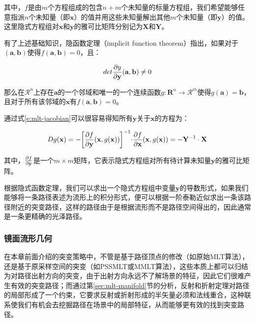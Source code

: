 \noindent 其中，$f$是由$m$个方程组成的包含$n+m$个未知量的标量方程组，我们希望能够任意指派$n$个未知量（即$\mathbf{x}$）的值并用这些未知量解出其他$m$个未知量（即$\mathbf{y}$）的值。这里隐式方程组对$\mathbf{x}$和$\mathbf{y}$的雅可比矩阵分别记为$\mathbf{X}$和$\mathbf{Y}$。

有了上述基础知识，隐函数定理（implicit function theorem）指出，如果对于$(\mathbf{a},\mathbf{b})$使得$f(\mathbf{a},\mathbf{b})=0$，且：

\begin{equation}
	det\frac{{\rm \partial} y}{{\rm \partial} \mathbf{y}}(\mathbf{a},\mathbf{b})\neq 0
\end{equation}

\noindent 那么在$\mathcal{R}^{n}$上存在$\mathbf{a}$的一个邻域和唯一的一个连续函数$g:\mathbf{R}^{n}\to\mathcal{R}^{m}$使得$g(\mathbf{a})=\mathbf{b}$，且对于所有该邻域的$\mathbf{x}$有$f(\mathbf{a},\mathbf{b})=0$。

通过式\ref{e:mlt-jacobian}可以很容易得知所有$\mathbf{y}$关于$\mathbf{x}$的方程为：

\begin{equation}\label{e:mlt-explicit-g}
	Dg(\mathbf{x})=-\biggl[\frac{{\rm \partial} f}{{\rm \partial}\mathbf{y}}(\mathbf{x},g(\mathbf{x})) \biggl]^{-1}\cdot\frac{{\rm \partial} f}{{\rm \partial}\mathbf{x}}(\mathbf{x},g(\mathbf{x}))=-\mathbf{Y}^{-1}\cdot\mathbf{X}
\end{equation}

\noindent 其中，$\frac{{\rm \partial} f}{{\rm \partial}\mathbf{y}}$是一个$m\times m$矩阵，它表示隐式方程组对所有待计算未知量$\mathbf{y}$的雅可比矩阵。

根据隐式函数定理，我们可以求出一个隐式方程组中变量$\mathbf{y}$的导数形式，如果我们能够将一条路径表述为流形上的积分形式，便可以根据一阶泰勒近似求出一条该路径附近的突变路径，这样的路径由于是根据流形而不是路径空间得出的，因此通常是一条更精确的光泽路径。





\subsubsection{镜面流形几何}
在本章前面介绍的突变策略中，不管是基于路径顶点的修改（如原始MLT算法），还是基于原采样空间的突变（如PSSMLT或MMLT算法），这些本质上都可以归结为对路径出射方向的突变，由于出射方向永远不了解场景的特征，因此它们很难产生有效的突变路径；而通过第\ref{sec:mlt-manifold}节的分析，反射和折射定理对路径的局部形成了一个约束，它要求反射或折射形成的半矢量必须和法线重合，这种联系使我们有机会去挖掘路径在场景中的局部特征，从而能够更有效的找到突变路径。


